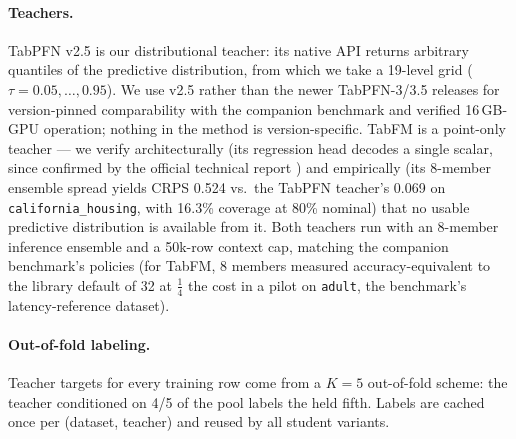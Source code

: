 \documentclass[11pt]{article}
\begin{document}
\paragraph{Teachers.} TabPFN v2.5 is our distributional teacher: its
native API returns arbitrary quantiles of the predictive distribution,
from which we take a 19-level grid ($\tau = 0.05, \ldots, 0.95$). We use
v2.5 rather than the newer TabPFN-3/3.5 releases \citep{tabpfn3-2026}
for version-pinned comparability with the companion benchmark and
verified 16\,GB-GPU operation; nothing in the method is
version-specific. TabFM is a point-only teacher --- we verify
architecturally (its regression head decodes a single scalar, since
confirmed by the official technical report \citep{kong2026}) and
empirically (its 8-member ensemble spread yields CRPS 0.524 vs.\ the
TabPFN teacher's 0.069 on \texttt{california\_\allowbreak housing}, with 16.3\%
coverage at 80\% nominal) that no usable predictive distribution is
available from it.
Both teachers run with an 8-member inference ensemble and a 50k-row context
cap, matching the companion benchmark's policies (for TabFM, 8 members
measured accuracy-equivalent to the library default of 32 at $\tfrac14$
the cost in a pilot on \texttt{adult}, the benchmark's
latency-reference dataset).

\paragraph{Out-of-fold labeling.} Teacher targets for every training row
come from a $K{=}5$ out-of-fold scheme: the teacher conditioned on 4/5 of
the pool labels the held fifth. Labels are cached once per (dataset,
teacher) and reused by all student variants.
\end{document}

